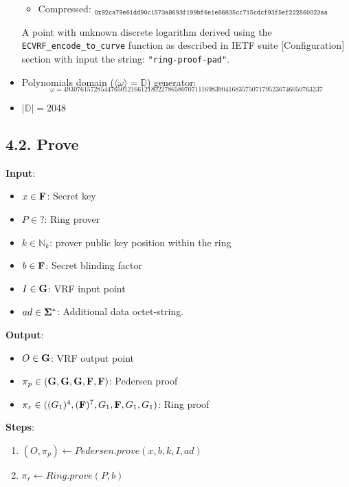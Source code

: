 \documentclass[
]{article}
\providecommand{\tightlist}{%
  \setlength{\itemsep}{0pt}\setlength{\parskip}{0pt}}
\begin{document}
\begin{itemize}
  \begin{itemize}
  \tightlist
  \item
    Compressed:
    \(_{\texttt{0x92ca79e61dd90c1573a8693f199bf6e1e86835cc715cdcf93f5ef222560023aa}}\)
  \end{itemize}

  A point with unknown discrete logarithm derived using the
  \texttt{ECVRF\_encode\_to\_curve} function as described in IETF suite
  {[}Configuration{]} section with input the string:
  \texttt{"ring-proof-pad"}.
\item
  Polynomials domain (\(\langle \omega \rangle = \mathbb{D}\))
  generator:
  \[_{\omega = 49307615728544765012166121802278658070711169839041683575071795236746050763237}\]
\item
  \(|\mathbb{D}| = 2048\)
\end{itemize}

\subsection{4.2. Prove}\label{prove-2}

\textbf{Input}:

\begin{itemize}
\tightlist
\item
  \(x \in \bold{F}\): Secret key
\item
  \(P \in ?\): Ring prover
\item
  \(k \in \mathbb{N}_k\): prover public key position within the ring
\item
  \(b \in \bold{F}\): Secret blinding factor
\item
  \(I \in \bold{G}\): VRF input point
\item
  \(ad \in \bold{\Sigma}^*\): Additional data octet-string.
\end{itemize}

\textbf{Output}:

\begin{itemize}
\tightlist
\item
  \(O \in \bold{G}\): VRF output point
\item
  \(\pi_p \in (\bold{G}, \bold{G}, \bold{G}, \bold{F}, \bold{F})\):
  Pedersen proof
\item
  \(\pi_r \in ((G_1)^4, (\bold{F})^7, G_1, \bold{F}, G_1, G_1)\): Ring
  proof
\end{itemize}

\textbf{Steps}:

\begin{enumerate}
\def\labelenumi{\arabic{enumi}.}
\tightlist
\item
  \((O, \pi_p) \gets Pedersen.prove(x, b, k, I, ad)\)
\item
  \(\pi_r \gets Ring.prove(P, b)\)
\end{enumerate}
\end{document}
